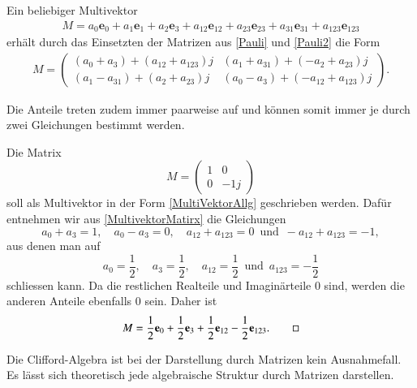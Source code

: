 \begin{hilfssatz}
	Ein beliebiger Multivektor
	\begin{align} \label{MultiVektorAllg}
	M = a_0\mathbf{e}_0 + a_1\mathbf{e}_1 + a_2\mathbf{e}_3 + a_{12}\mathbf{e}_{12} + a_{23}\mathbf{e}_{23} + a_{31}\mathbf{e}_{31} + a_{123}\mathbf{e}_{123}
	\end{align}
	erhält durch das Einsetzten der Matrizen aus \eqref{Pauli} und \eqref{Pauli2} die Form
	\begin{align}
	M =
	\begin{pmatrix}
	(a_0+a_3) + (a_{12}+a_{123})j & (a_1+a_{31})+(-a_2+a_{23})j \\
	(a_1-a_{31})+(a_2+a_{23})j & (a_0-a_3)+(-a_{12}+a_{123})j
	\end{pmatrix}.\label{MultivektorMatirx}
	\end{align}
\end{hilfssatz}
Die Anteile treten zudem immer paarweise auf und können somit immer je durch zwei Gleichungen bestimmt werden.
\begin{beispiel}
	Die Matrix
	\begin{equation*}
	M = 
	\begin{pmatrix}
	1 & 0 \\
	0 & -1j
	\end{pmatrix}
	\end{equation*}
	soll als Multivektor in der Form \eqref{MultiVektorAllg} geschrieben werden. Dafür entnehmen wir aus \eqref{MultivektorMatirx} die Gleichungen
	\begin{equation*}
	a_0 + a_3 = 1,\quad a_0 - a_3 = 0,\quad a_{12}+a_{123} = 0\enspace\text{und}\enspace -a_{12}+a_{123}=-1,
	\end{equation*}
	aus denen man auf
	\begin{equation*}
	a_0 = \dfrac{1}{2},\quad a_3 = \dfrac{1}{2},\quad a_{12}=\dfrac{1}{2}\enspace\text{und}\enspace a_{123}=-\dfrac{1}{2}
	\end{equation*}
	schliessen kann. Da die restlichen Realteile und Imaginärteile 0 sind, werden die anderen Anteile ebenfalls 0 sein. Daher ist
	\begin{equation*}
	M = \dfrac{1}{2} \mathbf{e}_0+ \dfrac{1}{2} \mathbf{e}_3 + \dfrac{1}{2} \mathbf{e}_{12} - \dfrac{1}{2} \mathbf{e}_{123}.
\qedhere
	\end{equation*}
\end{beispiel}
Die Clifford-Algebra ist bei der Darstellung durch Matrizen kein Ausnahmefall. Es lässt sich theoretisch jede algebraische Struktur durch Matrizen darstellen.
